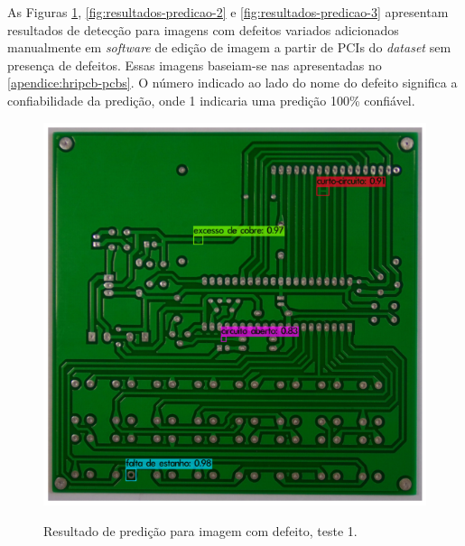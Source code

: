 As Figuras \ref{fig:resultados-predicao-1}, \ref{fig:resultados-predicao-2} e \ref{fig:resultados-predicao-3} apresentam resultados de detecção para imagens com defeitos variados adicionados manualmente em \textit{software} de edição de imagem a partir de PCIs do \textit{dataset} sem presença de defeitos.
Essas imagens baseiam-se nas apresentadas no \autoref{apendice:hripcb-pcbs}. O número indicado ao lado do nome do defeito significa a confiabilidade da predição, onde 1 indicaria uma predição 100\% confiável. 

\begin{figure}[H] %
  \centering
  \caption{Resultado de predição para imagem com defeito, teste 1.}
  \includegraphics[scale=0.5]{img/img-resultados-predicao-1.jpg}
  \label{fig:resultados-predicao-1}
\end{figure}

